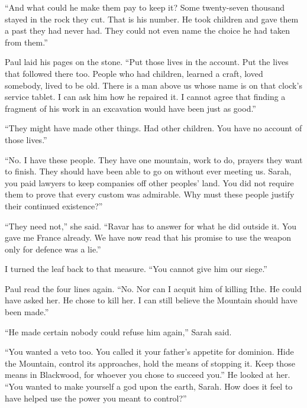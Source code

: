 ``And what could he make them pay to keep it? Some twenty-seven thousand stayed in the rock they cut. That is his number. He took children and gave them a past they had never had. They could not even name the choice he had taken from them.''\par

Paul laid his pages on the stone. ``Put those lives in the account. Put the lives that followed there too. People who had children, learned a craft, loved somebody, lived to be old. There is a man above us whose name is on that clock's service tablet. I can ask him how he repaired it. I cannot agree that finding a fragment of his work in an excavation would have been just as good.''\par

``They might have made other things. Had other children. You have no account of those lives.''\par

``No. I have these people. They have one mountain, work to do, prayers they want to finish. They should have been able to go on without ever meeting us. Sarah, you paid lawyers to keep companies off other peoples' land. You did not require them to prove that every custom was admirable. Why must these people justify their continued existence?''\par

``They need not,'' she said. ``Ravar has to answer for what he did outside it. You gave me France already. We have now read that his promise to use the weapon only for defence was a lie.''\par

I turned the leaf back to that measure. ``You cannot give him our siege.''\par

Paul read the four lines again. ``No. Nor can I acquit him of killing Ithe. He could have asked her. He chose to kill her. I can still believe the Mountain should have been made.''\par

``He made certain nobody could refuse him again,'' Sarah said.\par

``You wanted a veto too. You called it your father's appetite for dominion. Hide the Mountain, control its approaches, hold the means of stopping it. Keep those means in Blackwood, for whoever you chose to succeed you.'' He looked at her. ``You wanted to make yourself a god upon the earth, Sarah. How does it feel to have helped use the power you meant to control?''\par

